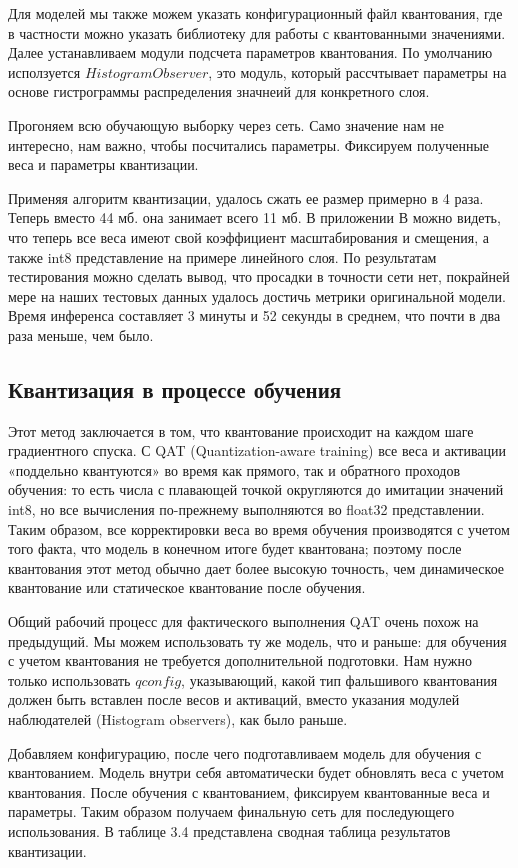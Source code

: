 \documentclass[oneside,final,12pt]{extreport}
\begin{document}
Для моделей мы также можем указать конфигурационный файл квантования, где в частности можно указать библиотеку для работы с квантованными значениями. Далее устанавливаем модули подсчета параметров квантования. По умолчанию исползуется $HistogramObserver$, это модуль, который рассчтывает параметры на основе гистрограммы распределения значнеий для конкретного слоя.

Прогоняем всю обучающую выборку через сеть. Само значение нам не интересно, нам важно, чтобы посчитались параметры. Фиксируем полученные веса и параметры квантизации. 

Применяя алгоритм квантизации, удалось сжать ее размер примерно в 4 раза. Теперь вместо 44 мб. она занимает всего 11 мб. В приложении В можно видеть, что теперь все веса имеют свой коэффициент масштабирования и смещения, а также  int8 представление на примере линейного слоя. По результатам тестирования можно сделать вывод, что просадки в точности сети нет, покрайней мере на наших тестовых данных удалось достичь метрики оригинальной модели. Время инференса составляет 3 минуты и 52 секунды в среднем, что почти в два раза меньше, чем было.

\subsection{Квантизация в процессе обучения}
Этот метод заключается в том, что квантование происходит на каждом шаге градиентного спуска. С QAT (Quantization-aware training) все веса и активации «поддельно квантуются» во время как прямого, так и обратного проходов обучения: то есть числа с плавающей точкой округляются до имитации значений int8, но все вычисления по-прежнему выполняются во float32 представлении. Таким образом, все корректировки веса во время обучения производятся с учетом того факта, что модель в конечном итоге будет квантована; поэтому после квантования этот метод обычно дает более высокую точность, чем динамическое квантование или статическое квантование после обучения.

Общий рабочий процесс для фактического выполнения QAT очень похож на предыдущий. Мы можем использовать ту же модель, что и раньше: для обучения с учетом квантования не требуется дополнительной подготовки. Нам нужно только использовать $qconfig$, указывающий, какой тип фальшивого квантования должен быть вставлен после весов и активаций, вместо указания модулей наблюдателей (Histogram observers), как было раньше.

Добавляем конфигурацию, после чего подготавливаем модель для обучения с квантованием. Модель внутри себя автоматически будет обновлять веса с учетом квантования. После обучения с квантованием, фиксируем квантованные веса и параметры. Таким образом получаем финальную сеть для последующего использования. В таблице 3.4 представлена сводная таблица результатов квантизации.
\end{document}

